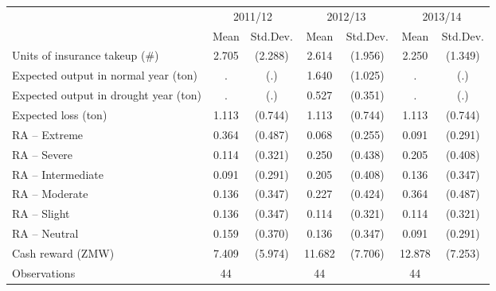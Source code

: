 {
\def\sym#1{\ifmmode^{#1}\else\(^{#1}\)\fi}
\begin{tabular}{l*{3}{cc}}
\hline\hline
                    &\multicolumn{2}{c}{2011/12}&\multicolumn{2}{c}{2012/13}&\multicolumn{2}{c}{2013/14}\\\cmidrule(lr){2-3}\cmidrule(lr){4-5}\cmidrule(lr){6-7}
                    &        Mean&    Std.Dev.&        Mean&    Std.Dev.&        Mean&    Std.Dev.\\
\hline
Units of insurance takeup (\#)&       2.705&     (2.288)&       2.614&     (1.956)&       2.250&     (1.349)\\
Expected output in normal year (ton)&           .&         (.)&       1.640&     (1.025)&           .&         (.)\\
Expected output in drought year (ton)&           .&         (.)&       0.527&     (0.351)&           .&         (.)\\
Expected loss (ton) &       1.113&     (0.744)&       1.113&     (0.744)&       1.113&     (0.744)\\
RA -- Extreme       &       0.364&     (0.487)&       0.068&     (0.255)&       0.091&     (0.291)\\
RA -- Severe        &       0.114&     (0.321)&       0.250&     (0.438)&       0.205&     (0.408)\\
RA -- Intermediate  &       0.091&     (0.291)&       0.205&     (0.408)&       0.136&     (0.347)\\
RA -- Moderate      &       0.136&     (0.347)&       0.227&     (0.424)&       0.364&     (0.487)\\
RA -- Slight        &       0.136&     (0.347)&       0.114&     (0.321)&       0.114&     (0.321)\\
RA -- Neutral       &       0.159&     (0.370)&       0.136&     (0.347)&       0.091&     (0.291)\\
Cash reward (ZMW)   &       7.409&     (5.974)&      11.682&     (7.706)&      12.878&     (7.253)\\
\hline
Observations        &          44&            &          44&            &          44&            \\
\hline\hline
\end{tabular}
}
